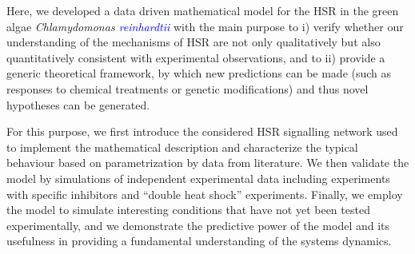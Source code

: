 \documentclass[oneside, 10pt, a4paper, twocolumn]{article}
\begin{document}

Here, we developed a data driven mathematical model for the HSR in the green algae \emph{Chlamydomonas \textcolor{blue}{reinhardtii}}
with the main purpose to i) verify whether our understanding of the mechanisms of HSR are not only qualitatively but also quantitatively  consistent with experimental observations,
and to ii) provide a generic theoretical framework, by which new predictions can be made (such as responses to chemical treatments or genetic modifications) 
and thus novel hypotheses can be generated.

For this purpose, we first introduce the considered HSR signalling network used to implement the mathematical description and characterize the typical behaviour 
based on parametrization by data from literature. 
We then validate the model by simulations of independent experimental data including experiments with specific inhibitors and  ``double heat shock'' experiments. 
Finally, we employ the model to simulate interesting conditions that have not yet been 
tested experimentally, and we demonstrate the predictive power of the model and its usefulness in providing a fundamental understanding of the 
systems dynamics. 
\end{document}
